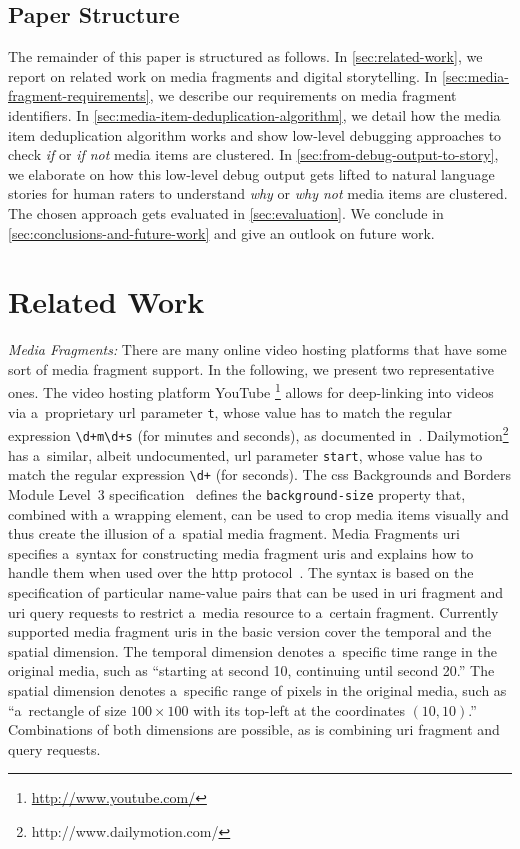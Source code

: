 \documentclass{article}
\begin{document}
\subsection{Paper Structure}
\label{sec:paper-structure}

The remainder of this paper is structured as follows.
In \autoref{sec:related-work}, we report on related work
on media fragments and digital storytelling.
In \autoref{sec:media-fragment-requirements}, we describe
our requirements on media fragment identifiers.
In \autoref{sec:media-item-deduplication-algorithm},
we detail how the media item deduplication algorithm works
and show low-level debugging approaches to check
\emph{if} or \emph{if not} media items are clustered.
In \autoref{sec:from-debug-output-to-story},
we elaborate on how this low-level debug output gets lifted
to natural language stories for human raters to understand
\emph{why} or \emph{why not} media items are clustered.
The chosen approach gets evaluated in \autoref{sec:evaluation}.
We conclude in \autoref{sec:conclusions-and-future-work}
and give an outlook on future work.

\section{Related Work}
\label{sec:related-work}

\noindent \textit{Media Fragments:}
There are many online video hosting platforms
that have some sort of media fragment support.
In the following, we present two representative ones.
The video hosting platform YouTube%
\footnote{\url{http://www.youtube.com/}}
allows for deep-linking into videos
via a~proprietary {\sc url} parameter \texttt{t},
whose value has to match the regular expression
\texttt{\textbackslash d+m\textbackslash d+s} (for minutes and seconds),
as documented in~\cite{youtube2008link}.
Dailymotion\footnote{http://www.dailymotion.com/}
has a~similar, albeit undocumented, {\sc url} parameter \texttt{start},
whose value has to match the regular expression
\texttt{\textbackslash d+} (for seconds).
The {\sc css} Backgrounds and Borders Module Level~3 specification~\cite{bos2012css3}
defines the \texttt{background-size} property
that, combined with a wrapping element,
can be used to crop media items visually
and thus create the illusion of a~spatial media fragment.
Media Fragments {\sc uri}~\cite{troncy2012mediafragments} specifies
a~syntax for constructing media fragment {\sc uri}s
and explains how to handle them
when used over the {\sc http} protocol~\cite{fielding1999http}.
The syntax is based on the specification of particular name-value pairs
that can be used in {\sc uri} fragment and {\sc uri} query requests
to restrict a~media resource to a~certain fragment.
Currently supported media fragment {\sc uri}s in the basic version
cover the temporal and the spatial dimension.
The temporal dimension denotes a~specific time range in the original media,
such as ``starting at second 10, continuing until second 20.''
The spatial dimension denotes a~specific range of pixels in the original media,
such as ``a~rectangle of size $ 100 \times 100 $
with its top-left at the coordinates $ (10, 10) $.''
Combinations of both dimensions are possible,
as is combining {\sc uri} fragment and query requests.
\end{document}
